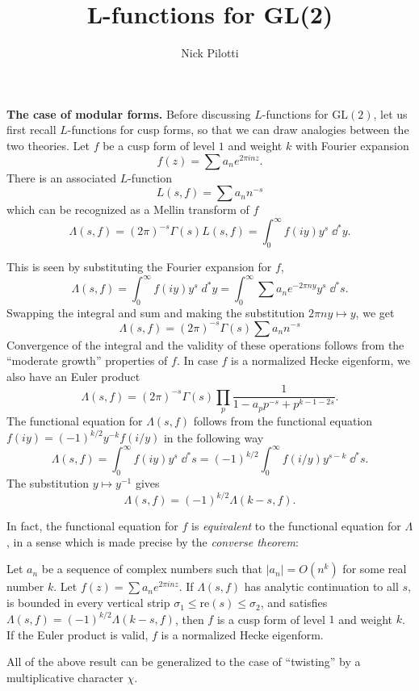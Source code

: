 \documentclass[12pt, letterpaper, twoside]
{article}
\title{L-functions for GL(2)}
\author{Nick Pilotti}
\newcommand{\dd}[1]{\mathrm{d}#1} %
\newcommand{\GL}{{\text{GL}}} %
\begin{document}
\maketitle

\textbf{The case of modular forms.} Before discussing $L$-functions for
$\GL(2)$, let us first recall $L$-functions for cusp forms, so that we can draw
analogies between the two theories. Let $f$ be a cusp form of level $1$ and
weight $k$ with Fourier expansion
\[f(z) = \sum a_n e^{2\pi i n z}.\] There is an associated $L$-function
\[L(s, f) = \sum a_n n^{-s}\] which can be recognized as a Mellin transform of
$f$
\[\Lambda(s, f) = (2\pi)^{-s}\Gamma(s)L(s, f) = \int_0^{\infty} f(iy)y^s \;
\dd^* y.\]

This is seen by substituting the Fourier expansion for $f$,
\[\Lambda(s, f) = \int_0^\infty f(iy)y^s \; d^* y = \int_0^\infty \sum
a_ne^{-2\pi ny} y^s \; \dd^* s.\] Swapping the integral and sum and making the
substitution $2\pi n y \mapsto y$, we get
\[\Lambda(s, f) = (2\pi)^{-s}\Gamma(s)\sum a_nn^{-s}\] Convergence of the
integral and the validity of these operations follows from the ``moderate
growth'' properties of $f$. In case $f$ is a normalized Hecke eigenform, we also
have an Euler product
\[\Lambda(s, f) = (2\pi)^{-s}\Gamma(s) \prod_p \frac{1}{1 - a_pp^{-s} + p^{k - 1
- 2s}}.\] The functional equation for $\Lambda(s, f)$ follows from the
functional equation $f(iy) = (-1)^{k/2}y^{-k}f(i/y)$ in the following way
\[\Lambda(s, f) = \int_0^\infty f(iy)y^{s} \; \dd^* s = (-1)^{k/2} \int_0^\infty
f(i/y) y^{s - k} \; \dd^* s.\] The substitution $y \mapsto y^{-1}$ gives
\[\Lambda(s, f) = (-1)^{k/2}\Lambda(k - s, f).\]

In fact, the functional equation for $f$ is \textit{equivalent} to the
functional equation for $\Lambda$, in a sense which is made precise by the
\textit{converse theorem}:

Let $a_n$ be a sequence of complex numbers such that $|a_n| = O(n^k)$ for some
real number $k$. Let $f(z) = \sum a_n e^{2\pi i n z}$. If $\Lambda(s, f)$ has
analytic continuation to all $s$, is bounded in every vertical strip $\sigma_1
\leq \text{re}(s) \leq \sigma_2$, and satisfies $\Lambda(s, f) =
(-1)^{k/2}\Lambda(k - s, f)$, then $f$ is a cusp form of level $1$ and weight
$k$. If the Euler product is valid, $f$ is a normalized Hecke eigenform.

All of the above result can be generalized to the case of ``twisting'' by a
multiplicative character $\chi$.
\end{document}
